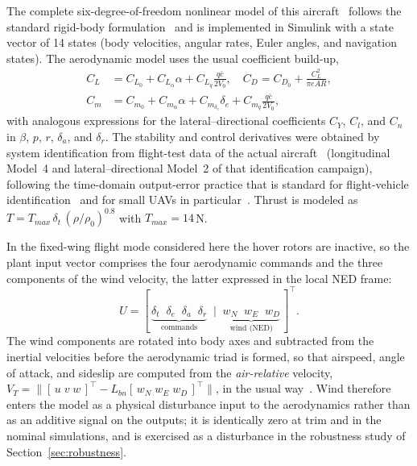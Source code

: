 The complete six-degree-of-freedom nonlinear model of this
aircraft~\cite{ferreira2019modeling,repo} follows the standard rigid-body
formulation~\cite{stevens2016aircraft} and is implemented in Simulink with a
state vector of 14 states (body velocities, angular rates, Euler angles,
and navigation states). The aerodynamic model uses the usual
coefficient build-up,
\begin{equation}
\begin{aligned}
C_L &= C_{L_0} + C_{L_\alpha}\alpha + C_{L_q}\frac{q\bar{c}}{2V_0}, \quad
C_D = C_{D_0} + \frac{C_L^2}{\pi e AR},\\
C_m &= C_{m_0} + C_{m_\alpha}\alpha + C_{m_{\delta_e}}\delta_e +
C_{m_q}\frac{q\bar{c}}{2V_0},
\end{aligned}
\end{equation}
with analogous expressions for the lateral--directional coefficients
$C_Y$, $C_l$, and $C_n$ in $\beta$, $p$, $r$, $\delta_a$, and $\delta_r$.
The stability and control derivatives were obtained by system
identification from flight-test data of the actual
aircraft~\cite{angelo2026} (longitudinal Model~4 and
lateral--directional Model~2 of that identification campaign),
following the time-domain output-error practice that is standard for
flight-vehicle identification~\cite{jategaonkar2006flight} and for
small UAVs in particular~\cite{dorobantu2012system}. Thrust is
modeled as $T = T_{max}\,\delta_t\,(\rho/\rho_0)^{0.8}$ with
$T_{max}=14$\,N.

In the fixed-wing flight mode considered here the hover rotors are
inactive, so the plant input vector comprises the four aerodynamic
commands and the three components of the wind velocity, the latter
expressed in the local NED frame:
\begin{equation}
\label{eq:inputvec}
U=[\,\underbrace{\delta_t\;\;\delta_e\;\;\delta_a\;\;\delta_r}_{\text{commands}}
\;\;|\;\;
\underbrace{w_N\;\;w_E\;\;w_D}_{\text{wind (NED)}}\,]^{\!\top}.
\end{equation}
The wind components are rotated into body axes and subtracted from the
inertial velocities before the aerodynamic triad is formed, so that
airspeed, angle of attack, and sideslip are computed from the
\emph{air-relative} velocity,
$V_T=\lVert[\,u\;v\;w\,]^{\!\top}-L_{bn}[\,w_N\;w_E\;w_D\,]^{\!\top}\rVert$,
in the usual way~\cite{stevens2016aircraft}. Wind therefore enters the model as a
physical disturbance input to the aerodynamics rather than as an additive
signal on the outputs; it is identically zero at trim and in the nominal
simulations, and is exercised as a disturbance in the robustness study of
Section~\ref{sec:robustness}.

